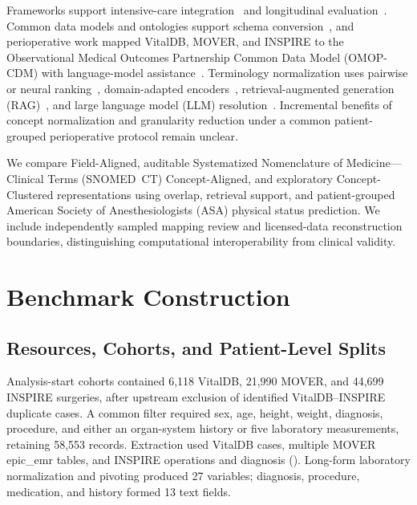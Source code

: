 \documentclass[a4paper,conference]{IEEEtran}
\newcommand{\fieldaligned}{Field-Aligned}
\newcommand{\conceptaligned}{Concept-Aligned}
\newcommand{\conceptclustered}{Concept-Clustered}
\newcommand{\fieldname}[1]{{\normalfont #1}}
\begin{document}
Frameworks support intensive-care integration~\cite{ricu,yaib} and longitudinal evaluation~\cite{ehrshot}. Common data models and ontologies support schema conversion~\cite{ohdsi,snomed,umls}, and perioperative work mapped VitalDB, MOVER, and INSPIRE to the Observational Medical Outcomes Partnership Common Data Model (\mbox{OMOP-CDM}) with language-model assistance~\cite{kim_omop_perioperative}. Terminology normalization uses pairwise or neural ranking~\cite{dnorm,bert_normalization,n2c2}, domain-adapted encoders~\cite{clinicalbert}, retrieval-augmented generation (RAG)~\cite{rag}, and large language model (LLM) resolution~\cite{llm_snomed}. Incremental benefits of concept normalization and granularity reduction under a common patient-grouped perioperative protocol remain unclear.

We compare \fieldaligned{}, auditable Systematized Nomenclature of Medicine---Clinical Terms (\mbox{SNOMED CT}) \conceptaligned{}, and exploratory \conceptclustered{} representations using overlap, retrieval support, and patient-grouped American Society of Anesthesiologists (ASA) physical status prediction. We include independently sampled mapping review and licensed-data reconstruction boundaries, distinguishing computational interoperability from clinical validity.

\section{Benchmark Construction}
\subsection{Resources, Cohorts, and Patient-Level Splits}
Analysis-start cohorts contained 6,118 VitalDB, 21,990 MOVER, and 44,699 INSPIRE surgeries, after upstream exclusion of identified VitalDB--INSPIRE duplicate cases. A common filter required sex, age, height, weight, diagnosis, procedure, and either an organ-system history or five laboratory measurements, retaining 58,553 records. Extraction used VitalDB \fieldname{cases}, multiple MOVER \fieldname{epic\_emr} tables, and INSPIRE \fieldname{operations} and \fieldname{diagnosis} (). Long-form laboratory normalization and pivoting produced 27 variables; diagnosis, procedure, medication, and history formed 13 text fields.
\end{document}
